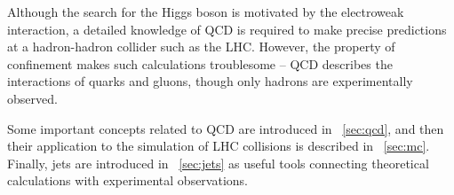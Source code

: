 
Although the search for the Higgs boson is motivated by the electroweak interaction, a
detailed knowledge of \ac{QCD} is required to make precise predictions at a hadron-hadron
collider such as the LHC. However, the property of confinement makes such 
calculations troublesome -- \ac{QCD} describes the interactions of quarks and gluons, 
though only hadrons are experimentally observed.

Some important concepts related to \ac{QCD} are introduced in \Section~\ref{sec:qcd}, and 
then their application to the simulation of LHC collisions is described in 
\Section~\ref{sec:mc}. Finally, jets are introduced in \Section~\ref{sec:jets} as useful 
tools connecting theoretical calculations with experimental observations.
